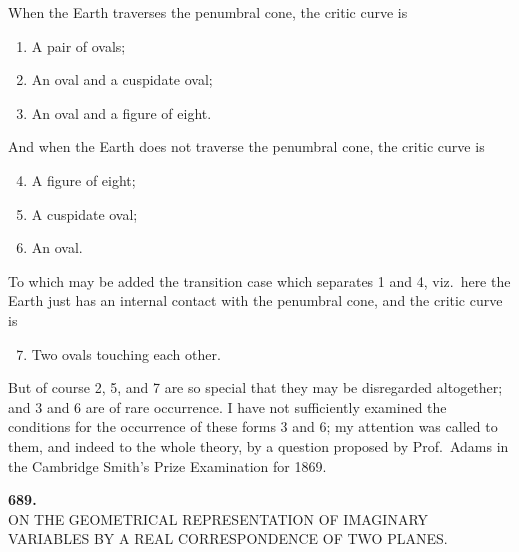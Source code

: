 \documentclass[11pt,a4paper]{article}
\begin{document}
\medskip

When the Earth traverses the penumbral cone, the critic curve is
\begin{enumerate}
\item A pair of ovals;
\item An oval and a cuspidate oval;
\item An oval and a figure of eight.
\end{enumerate}

And when the Earth does not traverse the penumbral cone, the critic curve is
\begin{enumerate}
\setcounter{enumi}{3}
\item A figure of eight;
\item A cuspidate oval;
\item An oval.
\end{enumerate}

To which may be added the transition case which separates 1 and 4, viz.\ here the Earth just has an internal contact with the penumbral cone, and the critic curve is
\begin{enumerate}
\setcounter{enumi}{6}
\item Two ovals touching each other.
\end{enumerate}

But of course 2, 5, and 7 are so special that they may be disregarded altogether; and 3 and 6 are of rare occurrence. I have not sufficiently examined the conditions for the occurrence of these forms 3 and 6; my attention was called to them, and indeed to the whole theory, by a question proposed by Prof.\ Adams in the Cambridge Smith's Prize Examination for 1869.

\newpage



\begin{center}
\textbf{689.}\\[6pt]
\large ON THE GEOMETRICAL REPRESENTATION OF IMAGINARY\\ VARIABLES BY A REAL CORRESPONDENCE OF TWO PLANES.
\end{center}

\medskip

\end{document}
